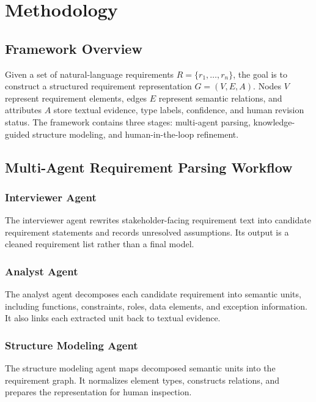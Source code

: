 \section{Methodology}
\label{methodology}

\subsection{Framework Overview}
\label{sec:method-overview}

Given a set of natural-language requirements $R=\{r_1,\ldots,r_n\}$, the goal is to construct a structured requirement representation $G=(V,E,A)$.
Nodes $V$ represent requirement elements, edges $E$ represent semantic relations, and attributes $A$ store textual evidence, type labels, confidence, and human revision status.
The framework contains three stages: multi-agent parsing, knowledge-guided structure modeling, and human-in-the-loop refinement.

\subsection{Multi-Agent Requirement Parsing Workflow}
\label{sec:method-workflow}

\subsubsection{Interviewer Agent}
\label{sec:method-interviewer}

The interviewer agent rewrites stakeholder-facing requirement text into candidate requirement statements and records unresolved assumptions.
Its output is a cleaned requirement list rather than a final model.

\subsubsection{Analyst Agent}
\label{sec:method-analyst}

The analyst agent decomposes each candidate requirement into semantic units, including functions, constraints, roles, data elements, and exception information.
It also links each extracted unit back to textual evidence.

\subsubsection{Structure Modeling Agent}
\label{sec:method-structure-agent}

The structure modeling agent maps decomposed semantic units into the requirement graph.
It normalizes element types, constructs relations, and prepares the representation for human inspection.

